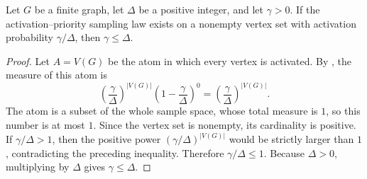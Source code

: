 \begin{lemma}
Let $G$ be a finite graph, let $\Delta$ be a positive integer, and let
$\gamma>0$.  If the activation--priority sampling law
 exists on a nonempty vertex set with
activation probability $\gamma/\Delta$, then $\gamma\le \Delta$.
\end{lemma}
\begin{proof}
Let $A=V(G)$ be the atom in which every vertex is activated.  By
, the measure of this atom is
\[
\left(\frac{\gamma}{\Delta}\right)^{|V(G)|}
\left(1-\frac{\gamma}{\Delta}\right)^0
=\left(\frac{\gamma}{\Delta}\right)^{|V(G)|}.
\]
The atom is a subset of the whole sample space, whose total measure is $1$,
so this number is at most $1$.  Since the vertex set is nonempty, its
cardinality is positive.  If $\gamma/\Delta>1$, then the positive power
$(\gamma/\Delta)^{|V(G)|}$ would be strictly larger than $1$, contradicting
the preceding inequality.  Therefore $\gamma/\Delta\le 1$.  Because
$\Delta>0$, multiplying by $\Delta$ gives $\gamma\le\Delta$.
\end{proof}
